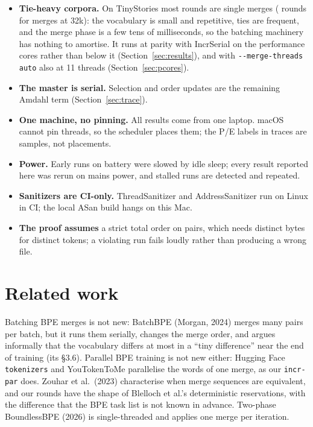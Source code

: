 \documentclass[11pt,a4paper]{article}
\newcommand{\code}[1]{\texttt{#1}}
\begin{document}
\begin{itemize}
\item \textbf{Tie-heavy corpora.} On TinyStories most rounds are single merges (\tsDefaultRounds{} rounds for \tsMerges{}
  merges at 32k): the vocabulary is small and repetitive, ties are frequent, and the merge phase is a few tens of
  milliseconds, so the batching machinery has nothing to amortise. It runs at parity with IncrSerial on the performance
  cores rather than below it (Section~\ref{sec:results}), and with \code{-{}-merge-threads auto} also at 11 threads
  (Section~\ref{sec:pcores}).
\item \textbf{The master is serial.} Selection and order updates are the remaining Amdahl term
  (Section~\ref{sec:trace}).
\item \textbf{One machine, no pinning.} All results come from one laptop. macOS cannot pin threads, so the scheduler places
  them; the P/E labels in traces are samples, not placements.
\item \textbf{Power.} Early runs on battery were slowed by idle sleep; every result reported here was rerun on mains power,
  and stalled runs are detected and repeated.
\item \textbf{Sanitizers are CI-only.} ThreadSanitizer and AddressSanitizer run on Linux in CI; the local ASan build hangs
  on this Mac.
\item \textbf{The proof assumes} a strict total order on pairs, which needs distinct bytes for distinct tokens; a
  violating run fails loudly rather than producing a wrong file.
\end{itemize}

\section{Related work}

Batching BPE merges is not new: BatchBPE (Morgan, 2024) merges many pairs per batch, but it runs them serially, changes
the merge order, and argues informally that the vocabulary differs at most in a ``tiny difference'' near the end of
training (its \S3.6). Parallel BPE training is not new either: Hugging Face \code{tokenizers} and YouTokenToMe parallelise
the words of one merge, as our \code{incr-par} does. Zouhar et al.\ (2023) characterise when merge sequences are
equivalent, and our rounds have the shape of Blelloch et al.'s deterministic reservations, with the difference that the BPE
task list is not known in advance. Two-phase BoundlessBPE (2026) is single-threaded and applies one merge per iteration.
\end{document}
